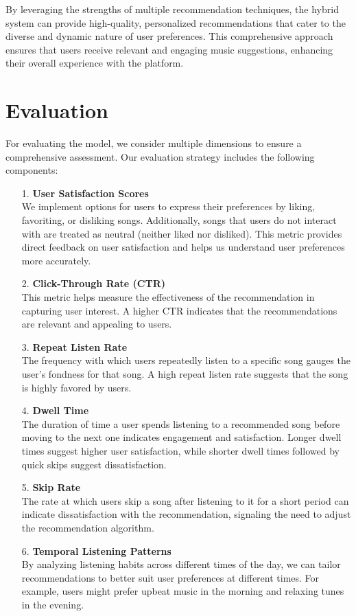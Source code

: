\documentclass[9pt,twocolumn,twoside,lineno]{gsajnl}
\begin{document}
By leveraging the strengths of multiple recommendation techniques, the hybrid system can provide high-quality, personalized recommendations that cater to the diverse and dynamic nature of user preferences. This comprehensive approach ensures that users receive relevant and engaging music suggestions, enhancing their overall experience with the platform.

\section{Evaluation}
For evaluating the model, we consider multiple dimensions to ensure a comprehensive assessment. Our evaluation strategy includes the following components:
\begin{itemize}
    \item[1. ] \textbf{User Satisfaction Scores}\\We implement options for users to express their preferences by liking, favoriting, or disliking songs. Additionally, songs that users do not interact with are treated as neutral (neither liked nor disliked). This metric provides direct feedback on user satisfaction and helps us understand user preferences more accurately.
    \item[2. ] \textbf{Click-Through Rate (CTR)}\\This metric helps measure the effectiveness of the recommendation in capturing user interest. A higher CTR indicates that the recommendations are relevant and appealing to users.
    \item[3. ] \textbf{Repeat Listen Rate}\\The frequency with which users repeatedly listen to a specific song gauges the user’s fondness for that song. A high repeat listen rate suggests that the song is highly favored by users.
    \item[4. ] \textbf{Dwell Time}\\The duration of time a user spends listening to a recommended song before moving to the next one indicates engagement and satisfaction. Longer dwell times suggest higher user satisfaction, while shorter dwell times followed by quick skips suggest dissatisfaction.
    \item[5. ] \textbf{Skip Rate}\\The rate at which users skip a song after listening to it for a short period can indicate dissatisfaction with the recommendation, signaling the need to adjust the recommendation algorithm.
    \item[6. ] \textbf{Temporal Listening Patterns}\\By analyzing listening habits across different times of the day, we can tailor recommendations to better suit user preferences at different times. For example, users might prefer upbeat music in the morning and relaxing tunes in the evening.
\end{itemize}
\end{document}
